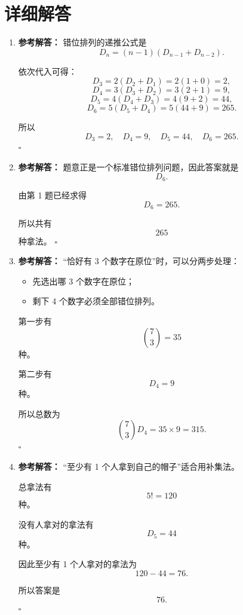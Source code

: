 \documentclass[11pt,a4paper,fontset=fandol]{ctexart}
\newenvironment{solution}{\par\noindent\textbf{参考解答：}}{\hfill$\square$\par}
\begin{document}
\newpage
\section{详细解答}

\begin{enumerate}
  \item \begin{solution}
  错位排列的递推公式是
  \[
  D_n=(n-1)(D_{n-1}+D_{n-2}).
  \]

  依次代入可得：
  \[
  D_3=2(D_2+D_1)=2(1+0)=2,
  \]
  \[
  D_4=3(D_3+D_2)=3(2+1)=9,
  \]
  \[
  D_5=4(D_4+D_3)=4(9+2)=44,
  \]
  \[
  D_6=5(D_5+D_4)=5(44+9)=265.
  \]

  所以
  \[
  D_3=2,\quad D_4=9,\quad D_5=44,\quad D_6=265.
  \]
  \end{solution}

  \item \begin{solution}
  题意正是一个标准错位排列问题，因此答案就是
  \[
  D_6.
  \]

  由第 1 题已经求得
  \[
  D_6=265.
  \]

  所以共有
  \[
  265
  \]
  种拿法。
  \end{solution}

  \item \begin{solution}
  “恰好有 3 个数字在原位”时，可以分两步处理：
  \begin{itemize}
    \item 先选出哪 3 个数字在原位；
    \item 剩下 4 个数字必须全部错位排列。
  \end{itemize}

  第一步有
  \[
  \binom{7}{3}=35
  \]
  种。

  第二步有
  \[
  D_4=9
  \]
  种。

  所以总数为
  \[
  \binom{7}{3}D_4=35\times 9=315.
  \]
  \end{solution}

  \item \begin{solution}
  “至少有 1 个人拿到自己的帽子”适合用补集法。

  总拿法有
  \[
  5!=120
  \]
  种。

  没有人拿对的拿法有
  \[
  D_5=44
  \]
  种。

  因此至少有 1 个人拿对的拿法为
  \[
  120-44=76.
  \]

  所以答案是
  \[
  76.
  \]
  \end{solution}


\end{enumerate}
\end{document}
